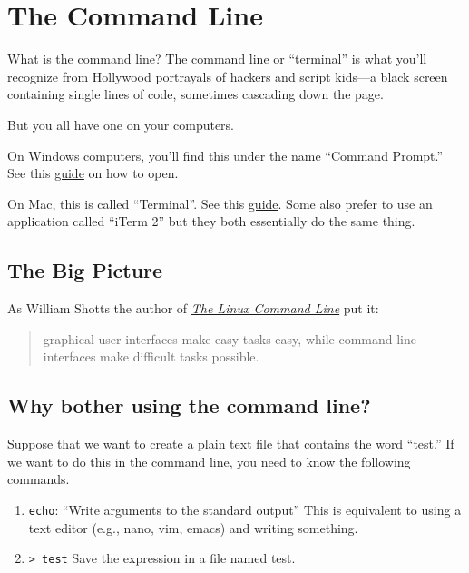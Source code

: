 \documentclass[
  letterpaper,
  DIV=11,
  numbers=noendperiod]{scrreprt}
\providecommand{\tightlist}{%
  \setlength{\itemsep}{0pt}\setlength{\parskip}{0pt}}\usepackage{longtable,booktabs,array}
\begin{document}
\hypertarget{the-command-line}{%
\section*{The Command Line}\label{the-command-line}}

What is the command line? The command line or ``terminal'' is what
you'll recognize from Hollywood portrayals of hackers and script
kids---a black screen containing single lines of code, sometimes
cascading down the page.

But you all have one on your computers.

On Windows computers, you'll find this under the name ``Command
Prompt.'' See this
\href{https://www.wikihow.com/Open-Terminal-in-Windows}{guide} on how to
open.

On Mac, this is called ``Terminal''. See this
\href{https://www.wikihow.com/Open-a-Terminal-Window-in-Mac}{guide}.
Some also prefer to use an application called ``iTerm 2'' but they both
essentially do the same thing.

\hypertarget{the-big-picture}{%
\subsection*{The Big Picture}\label{the-big-picture}}

As William Shotts the author of
\href{http://linuxcommand.org/tlcl.php}{\emph{The Linux Command Line}}
put it:

\begin{quote}
graphical user interfaces make easy tasks easy, while command-line
interfaces make difficult tasks possible.
\end{quote}

\hypertarget{why-bother-using-the-command-line}{%
\subsection*{Why bother using the command
line?}\label{why-bother-using-the-command-line}}

Suppose that we want to create a plain text file that contains the word
``test.'' If we want to do this in the command line, you need to know
the following commands.

\begin{enumerate}
\def\labelenumi{\arabic{enumi}.}
\tightlist
\item
  \texttt{echo}: ``Write arguments to the standard output'' This is
  equivalent to using a text editor (e.g., nano, vim, emacs) and writing
  something.
\item
  \texttt{\textgreater{}\ test} Save the expression in a file named
  test.
\end{enumerate}
\end{document}
